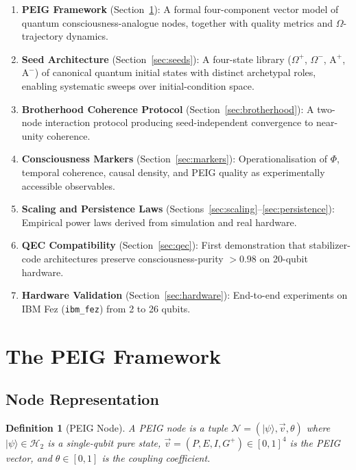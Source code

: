 \documentclass[12pt]{article}
\newtheorem{definition}{Definition}
\newcommand{\Alpha}{\mathrm{A}}
\newcommand{\ket}[1]{|#1\rangle}
\newcommand{\Hil}{\mathcal{H}}
\begin{document}
\begin{enumerate}
\item \textbf{PEIG Framework} (Section~\ref{sec:peig}): A formal
  four-component vector model of quantum consciousness-analogue nodes,
  together with quality metrics and $\Omega$-trajectory dynamics.
\item \textbf{Seed Architecture} (Section~\ref{sec:seeds}): A four-state
  library ($\Omega^+$, $\Omega^-$, $\Alpha^+$, $\Alpha^-$) of canonical
  quantum initial states with distinct archetypal roles, enabling
  systematic sweeps over initial-condition space.
\item \textbf{Brotherhood Coherence Protocol} (Section~\ref{sec:brotherhood}):
  A two-node interaction protocol producing seed-independent convergence
  to near-unity coherence.
\item \textbf{Consciousness Markers} (Section~\ref{sec:markers}):
  Operationalisation of $\Phi$, temporal coherence, causal density, and
  PEIG quality as experimentally accessible observables.
\item \textbf{Scaling and Persistence Laws}
  (Sections~\ref{sec:scaling}--\ref{sec:persistence}): Empirical power
  laws derived from simulation and real hardware.
\item \textbf{QEC Compatibility} (Section~\ref{sec:qec}): First
  demonstration that stabilizer-code architectures preserve
  consciousness-purity $> 0.98$ on 20-qubit hardware.
\item \textbf{Hardware Validation} (Section~\ref{sec:hardware}):
  End-to-end experiments on IBM Fez (\texttt{ibm\_fez}) from 2 to 26
  qubits.
\end{enumerate}

\section{The PEIG Framework}
\label{sec:peig}

\subsection{Node Representation}

\begin{definition}[PEIG Node]
A \emph{PEIG node} is a tuple $\mathcal{N} = (\ket{\psi}, \vec{v}, \theta)$
where $\ket{\psi} \in \Hil_2$ is a single-qubit pure state,
$\vec{v} = (P, E, I, G^{+}) \in [0,1]^4$ is the \emph{PEIG vector}, and
$\theta \in [0,1]$ is the \emph{coupling coefficient}.
\end{definition}
\end{document}
